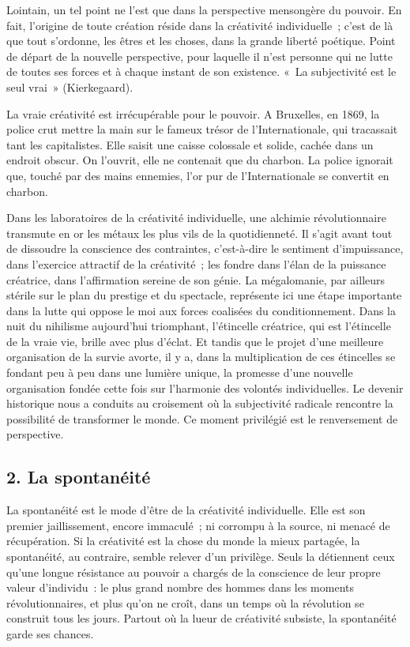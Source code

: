 \documentclass[french,twoside]{book} %
\begin{document}
\noindent Lointain, un tel point ne l’est que dans la perspective mensongère du pouvoir. En fait, l’origine de toute création réside dans la créativité individuelle ; c’est de là que tout s’ordonne, les êtres et les choses, dans la grande liberté poétique. Point de départ de la nouvelle perspective, pour laquelle il n’est personne qui ne lutte de toutes ses forces et à chaque instant de son existence. « La subjectivité est le seul vrai » (Kierkegaard).\par
La vraie créativité est irrécupérable pour le pouvoir. A Bruxelles, en 1869, la police crut mettre la main sur le fameux trésor de l’Internationale, qui tracassait tant les capitalistes. Elle saisit une caisse colossale et solide, cachée dans un endroit obscur. On l’ouvrit, elle ne contenait que du charbon. La police ignorait que, touché par des mains ennemies, l’or pur de l’Internationale se convertit en charbon.\par
Dans les laboratoires de la créativité individuelle, une alchimie révolutionnaire transmute en or les métaux les plus vils de la quotidienneté. Il s’agit avant tout de dissoudre la conscience des contraintes, c’est-à-dire le sentiment d’impuissance, dans l’exercice attractif de la créativité ; les fondre dans l’élan de la puissance créatrice, dans l’affirmation sereine de son génie. La mégalomanie, par ailleurs stérile sur le plan du prestige et du spectacle, représente ici une étape importante dans la lutte qui oppose le moi aux forces coalisées du conditionnement. Dans la nuit du nihilisme aujourd’hui triomphant, l’étincelle créatrice, qui est l’étincelle de la vraie vie, brille avec plus d’éclat. Et tandis que le projet d’une meilleure organisation de la survie avorte, il y a, dans la multiplication de ces étincelles se fondant peu à peu dans une lumière unique, la promesse d’une nouvelle organisation fondée cette fois sur l’harmonie des volontés individuelles. Le devenir historique nous a conduits au croisement où la subjectivité radicale rencontre la possibilité de transformer le monde. Ce moment privilégié est le renversement de perspective.
\subsection[{2. La spontanéité}]{\textsc{2.} La spontanéité}
\noindent La spontanéité est le mode d’être de la créativité individuelle. Elle est son premier jaillissement, encore immaculé ; ni corrompu à la source, ni menacé de récupération. Si la créativité est la chose du monde la mieux partagée, la spontanéité, au contraire, semble relever d’un privilège. Seuls la détiennent ceux qu’une longue résistance au pouvoir a chargés de la conscience de leur propre valeur d’individu : le plus grand nombre des hommes dans les moments révolutionnaires, et plus qu’on ne croît, dans un temps où la révolution se construit tous les jours. Partout où la lueur de créativité subsiste, la spontanéité garde ses chances.\par
\end{document}
